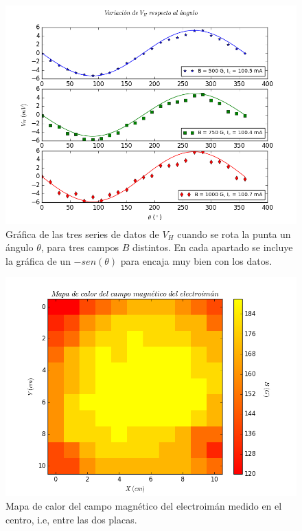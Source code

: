 \documentclass[twocolumn,showpacs,preprintnumbers,amsmath,amssymb]{revtex4-1}
\begin{document}
\begin{figure}
\includegraphics[scale=0.46]{figura_6.png}
\caption{\label{fig:epsart}Gráfica de las tres series de datos de $V_H$ cuando se rota la punta un ángulo $\theta$, para tres campos $B$
distintos. En cada apartado se incluye la gráfica de un $-sen(\theta)$ para encaja muy bien con los datos.}
\end{figure}


\begin{figure}
\includegraphics[scale=0.46]{figura_7.png}
\caption{\label{fig:epsart}Mapa de calor del campo magnético del electroimán medido en el centro, i.e, entre las dos placas.}
\end{figure}
\end{document}
